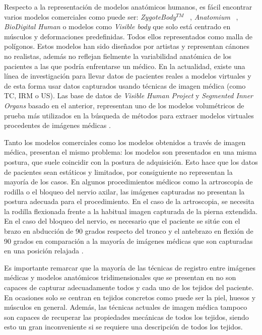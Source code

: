 Respecto a la representación de modelos anatómicos humanos, es fácil encontrar  varios modelos comerciales como puede ser: \emph{ZygoteBody}$^{TM}$ ~\cite{kelc2012zygote}, \emph{Anatomium} ~\cite{Anatomium},   \emph{BioDigital Human} \cite{qualter2012biodigital} o modelos como \emph{Visible body}\cite{visible2012visible} que solo está centrado en músculos y deformaciones predefinidas. Todos ellos representados como malla de polígonos. Estos modelos han sido  diseñados por artistas y representan cánones no realistas, además no reflejan fielmente la variabilidad anatómica de los pacientes a las que podría enfrentarse un médico. En la actualidad, existe una línea de investigación para llevar datos de pacientes reales a modelos virtuales y de esta forma usar datos capturados usando técnicas de imagen médica (como \ac{TC}, \ac{IRM} o \ac{US}). Las base de datos de  \emph{Visible Human Project}\cite{ackerman1998visible} y  \emph{Segmented Inner Organs}\cite{VoxelMan} basado en el anterior, representan uno de los modelos volumétricos de prueba más utilizados en la búsqueda de métodos para extraer modelos virtuales procedentes de imágenes médicas \cite{ferrante2017slice}.

Tanto los modelos comerciales como los modelos obtenidos a través de imagen médica, presentan el mismo problema: los modelos son presentados en una misma postura, que suele coincidir con la postura de adquisición. Esto hace que los datos de pacientes sean estáticos y limitados, por consiguiente no representan la mayoría de los casos. En algunos procedimientos médicos como la artroscopia de rodilla o el bloqueo del nervio axilar, las imágenes capturadas no presentan la postura adecuada para el procedimiento. En el caso de la artroscopia, se necesita la rodilla flexionada frente a la habitual imagen capturada de la pierna extendida. En el caso del bloqueo del nervio, es necesario que el paciente se sitúe con el brazo en abducción de 90 grados respecto del tronco y el antebrazo en flexión de 90 grados en comparación a la mayoría de imágenes médicas que son capturadas en una posición relajada . 

Es importante remarcar que la mayoría de las técnicas de registro entre imágenes médicas y modelos anatómicos tridimensionales que se presentan en \cite{ferrante2017slice} no son capaces de capturar adecuadamente todos y cada uno de los tejidos del paciente. En ocasiones solo se centran en tejidos concretos como puede ser la piel, huesos y músculos en general. Además, las técnicas actuales de imagen médica tampoco son capaces de recuperar las propiedades mecánicas de todos los tejidos, siendo esto un gran inconveniente si se requiere una descripción de todos los tejidos.

